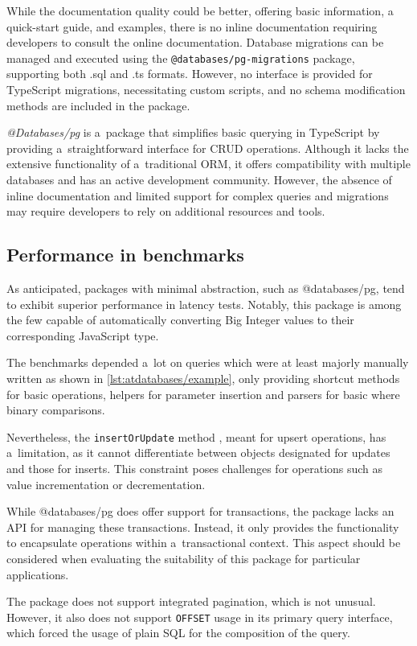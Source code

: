 While the documentation quality could be better, offering basic information, a
quick-start guide, and examples, there is no inline documentation requiring
developers to consult the online documentation. Database migrations can be
managed and executed using the \texttt{@databases/pg-migrations} package,
supporting both .sql and .ts formats. However, no interface is provided for
TypeScript migrations, necessitating custom scripts, and no schema modification
methods are included in the package.

\textit{@Databases/pg} is a~package that simplifies basic querying in TypeScript
by providing a~straightforward interface for CRUD operations. Although it lacks
the extensive functionality of a~traditional ORM, it offers compatibility with
multiple databases and has an active development community. However, the absence
of inline documentation and limited support for complex queries and migrations
may require developers to rely on additional resources and tools.

\subsection*{Performance in benchmarks}
As anticipated, packages with minimal abstraction, such as @databases/pg, tend
to exhibit superior performance in latency tests. Notably, this package is among
the few capable of automatically converting Big Integer values to their
corresponding JavaScript type.

The benchmarks depended a~lot on queries which were at least majorly manually
written as shown in \autoref{lst:atdatabases/example}, only providing shortcut
methods for basic operations, helpers for parameter insertion and parsers for
basic where binary comparisons.

Nevertheless, the \texttt{insertOrUpdate} method \cite{databases/pg}, meant for
upsert operations, has a~limitation, as it cannot differentiate between objects
designated for updates and those for inserts. This constraint poses challenges
for operations such as value incrementation or decrementation.

While @databases/pg does offer support for transactions, the package lacks an
API for managing these transactions. Instead, it only provides the functionality
to encapsulate operations within a~transactional context. This aspect should be
considered when evaluating the suitability of this package for particular
applications.

The package does not support integrated pagination, which is not unusual.
However, it also does not support \texttt{OFFSET} usage in its primary query
interface, which forced the usage of plain SQL for the composition of the query.
